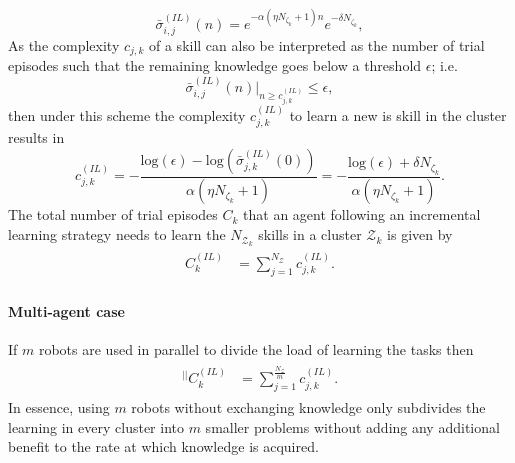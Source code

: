 \begin{equation*}\label{eq:remaining_knowledge__IL}
	\bar{\sigma}^{(IL)}_{i,j}(n) = e^{-\alpha  \left(\eta N_{\zeta_k}+1\right) n} e^{-\delta N_{\zeta_k}},
\end{equation*}
As the complexity $c_{j,k}$ of a skill can also be interpreted as the number of trial episodes such that the remaining knowledge goes below a threshold $\epsilon$; i.e.
\begin{equation*}
	\bar{\sigma}^{(IL)}_{i,j}(n) \rvert_{n \ge c^{(IL)}_{j,k}} \leq \epsilon,
\end{equation*}
then under this scheme the complexity $c^{(IL)}_{j,k}$ to learn a new is skill in the cluster results in
\begin{equation}\label{eq:complexity_IL}
	c^{(IL)}_{j,k} = -\frac{\text{log}(\epsilon) - \text{log}\left(\bar{\sigma}^{(IL)}_{j,k}(0)\right)}{\alpha (\eta N_{\zeta_k}+ 1)} = -\frac{\text{log}(\epsilon) + \delta N_{\zeta_k}}{\alpha (\eta N_{\zeta_k}+ 1)}  .
\end{equation}
The total number of trial episodes $ C_k $ that an agent following an incremental learning strategy needs to learn the $N_{\mathcal{Z}_k}$ skills in a cluster $ \mathcal{Z}_k $ is given by
\begin{align}\label{eq:total_episodes_incremental}
	\begin{split}
		C^{(IL)}_k &= \sum^{N_{\mathcal{Z}}}_{j=1} c^{(IL)}_{j,k}.
	\end{split}
\end{align}

\paragraph*{Multi-agent case}
If $m$ robots are used in parallel to divide the load of learning the tasks then
\begin{align}
	\begin{split}
		{}^{\lvert \rvert}C^{(IL)}_k &= \sum^{\frac{N_{\mathcal{Z}}}{m}}_{j=1} c^{(IL)}_{j,k}.
	\end{split}
\end{align}
In essence, using $m$ robots without exchanging knowledge only subdivides the learning in every cluster into $m$ smaller problems without adding any additional benefit to the rate at which knowledge is acquired. 

